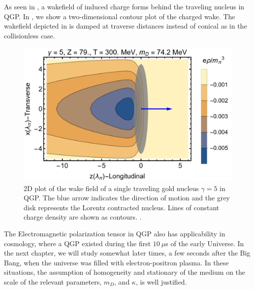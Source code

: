 As seen in , a wakefield of induced charge forms behind the traveling nucleus in QGP. In , we show a two-dimensional contour plot of the charged wake. The wakefield depicted in  is damped at traverse distances instead of conical as in the collisionless case.
\begin{figure}[ht]
\centering
\includegraphics[width=0.85\linewidth]{plots/chap02QCD/chwake.png}
\caption{2D plot of the wake field of a single traveling gold nucleus $\gamma = 5$ in QGP. The blue arrow indicates the direction of motion and the grey disk represents the Lorentz contracted nucleus. Lines of constant charge density are shown as contours. .\label{fig:chgwake}}
\end{figure}


The Electromagnetic polarization tensor in QGP also has applicability in cosmology, where a QGP existed during the first $10~\mu$s of the early Universe. In the next chapter, we will study somewhat later times, a few seconds after the Big Bang, when the universe was filled with electron-positron plasma. In these situations, the assumption of homogeneity and stationary of the medium on the scale of the relevant parameters, $m_D$, and $\kappa$, is well justified.







